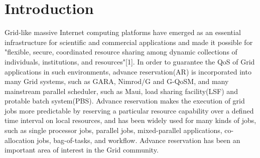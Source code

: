 \documentclass[preprint,12pt]{elsarticle}
\begin{document}
\section{Introduction}
\label{sec:introduce}

Grid-like massive Internet computing platforms have emerged as an essential infrastructure for scientific and commercial applications and made it possible for "flexible, secure, coordinated resource sharing among dynamic collections of individuals, institutions, and resources"[1]. In order to guarantee the QoS of Grid applications in such environments, advance reservation(AR) is incorporated into many Grid systems, such as GARA\cite{foster2004end}, Nimrod/G\cite{buyya2000nimrod} and G-QoSM\cite{al2002g}, and many mainstream parallel scheduler, such as Maui\cite{jackson2001core}, load sharing facility(LSF)\cite{lsf} and protable batch system(PBS)\cite{bode2000portable}. Advance reservation makes the execution of grid jobs more predictable by reserving a particular resource capability over a defined time interval on local resources, and has been widely used for many kinds of jobs, such as single processor jobs\cite{castillo2011online}, parallel jobs\cite{nurmi2009probabilistic},
mixed-parallel applications\cite{aida2009scheduling}, co-allocation jobs\cite{castillo2009resource},
bag-of-tasks\cite{lee2010rescheduling}, and workflow\cite{cucinotta2009advance}. Advance reservation has been an important area of interest in the Grid community.
\end{document}
